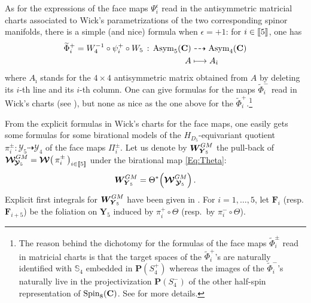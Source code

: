 \documentclass[11pt]{amsart}
\begin{document}
As for the expressions of the face maps $\Psi_i^\epsilon$ read in the antisymmetric matricial charts associated to Wick's parametrizations of the two corresponding spinor manifolds, there is a simple (and nice) formula when $\epsilon=+1$: for $i\in [\hspace{-0.05cm}[5]\hspace{-0.05cm}]$, one has 
\begin{align*}%
\widetilde \Phi_i^+ = W_4^{-1}\circ \psi_i^+\circ W_5 \, : \, 
{\rm Asym}_5(\mathbf C)& \dashrightarrow {\rm Asym}_4(\mathbf C)\\
A& \longmapsto A_{\hat \imath}
\end{align*}%
 where $A_{\hat \imath}$ stands for the $4\times 4$ antisymmetric matrix obtained from $A$ by deleting its $i$-th line and its $i$-th column.  One can give formulas for the maps 
 $\widetilde \Phi_i^-$ read in Wick's charts (see \cite[Prop.\,4.17]{PirioAFST}), but none as nice as the one above for the $ \widetilde \Phi_i^+$.\footnote{The reason behind the dichotomy for the formulas of the face maps $\widetilde \Phi_i^\pm$ read in matricial charts is that the target spaces of the 
 $\widetilde \Phi_i^+$'s are naturally identified with $\mathbb S_4$ embedded in $\mathbf P(S_4^+)$ whereas the images of the $\widetilde \Phi_i^-$'s naturally live in the projectivization $\mathbf P(S_4^-)$ of the other half-spin representation of ${\rm Spin}_8(\mathbf C)$. See \cite[\S4.5.2]{PirioAFST} for more details.}
 
 From the explicit formulas in Wick's charts for the face maps, one easily gets some formulas for some birational models of the $H_{D_5}$-equivariant quotient $\pi_i^\pm : \boldsymbol{\mathcal Y}_5\dashrightarrow \boldsymbol{\mathcal Y}_4$ of the face maps $\Pi_i^\pm$. Let us denote by $\boldsymbol{W}^{GM}_{\hspace{-0.05cm}\boldsymbol{Y}_5}$ the pull-back of $\boldsymbol{\mathcal W}^{GM}_{\hspace{-0.05cm}\boldsymbol{\mathcal Y}_5}=\boldsymbol{\mathcal W}\big( \, \pi_i^\pm\, \big)_{ i\in [\hspace{-0.05cm}[5]\hspace{-0.05cm}]}$ under the birational map \eqref{Eq:Theta}: 
 $$
 \boldsymbol{W}^{GM}_{\hspace{-0.05cm}\boldsymbol{Y}_5}=\Theta^*\Big( 
 \boldsymbol{\mathcal W}^{GM}_{\hspace{0.05cm}\boldsymbol{\mathcal Y}_5}
 \Big)\, . 
 $$
 Explicit first integrals for  $\boldsymbol{W}^{GM}_{\hspace{-0.05cm}\boldsymbol{Y}_5}
$ have been given in \cite{PirioAFST}. 
 For $i=1,\ldots,5$, let $\boldsymbol{F}_i$ (resp.\,$\boldsymbol{F}_{i+5}$) be the foliation on $\boldsymbol{Y}_5$ induced by $\pi_i^+\circ \Theta$ (resp.\, by $\pi_i^-\circ \Theta$). 
\end{document}
